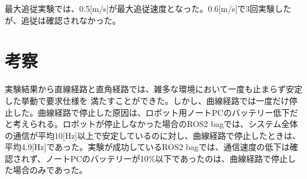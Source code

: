 最大追従実験では、0.5[m/s]が最大追従速度となった。0.6[m/s]で3回実験したが、追従は確認されなかった。

\section{考察}
実験結果から直線経路と直角経路では、雑多な環境において一度も止まらず安定した挙動で要求仕様を
満たすことができた。しかし、曲線経路では一度だけ停止した。曲線経路で停止した原因は、ロボット用ノートPCのバッテリー低下だと考えられる。ロボットが停止しなかった場合のROS2 bagでは、システム全体の通信が平均10[Hz]以上で安定しているのに対し、曲線経路で停止したときは、平均4.9[Hz]であった。実験が成功しているROS2 bagでは、通信速度の低下は確認されず、ノートPCのバッテリーが10\%以下であったのは、曲線経路で停止した場合のみであった。